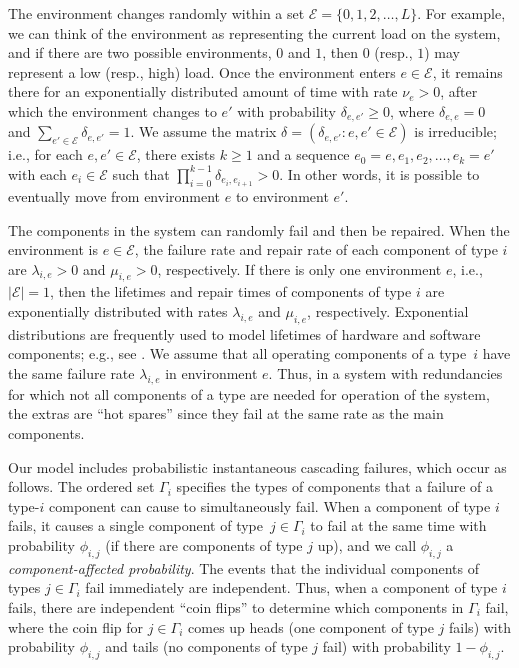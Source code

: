 \documentclass[12pt]{article}
\begin{document}
The environment changes randomly within a set $\mathcal{E} = \{ 0, 1, 2, \ldots,
L \}$. For example, we can think of the environment as representing the current
load on the system, and if there are two possible environments, $0$ and $1$,
then $0$ (resp., $1$) may represent a low (resp., high) load. Once the
environment enters $e \in \mathcal{E}$, it remains there for an exponentially
distributed amount of time with rate $\nu_e > 0$, after which the environment
changes to $e'$ with probability $\delta_{e, e'} \geq 0$, where $\delta_{e, e} =
0$ and $\sum_{e' \in \mathcal{E}} \delta_{e, e'} = 1$. We assume the matrix
$\delta = (\delta_{e, e'} : e, e' \in \mathcal{E})$ is irreducible; i.e., for
each $e, e' \in \mathcal{E}$, there exists $k \geq 1$ and a sequence $e_0 = e,
e_1, e_2, \ldots, e_k = e'$ with each $e_i \in \mathcal{E}$ such that $\prod_{i
= 0}^{k-1} \delta_{e_i, e_{i + 1}} > 0$. In other words, it is possible to
eventually move from environment $e$ to environment $e'$.

The components in the system can randomly fail and then be repaired. When the
environment is $e \in \mathcal{E}$, the failure rate and repair rate of each
component of type $i$ are $\lambda_{i, e} > 0$ and $\mu_{i, e} > 0$,
respectively.  If there is only one environment $e$, i.e., $| \mathcal{E} | =
1$, then the lifetimes and repair times of components of type $i$ are
exponentially distributed with rates $\lambda_{i, e}$ and $\mu_{i, e}$,
respectively. Exponential distributions are frequently used to model lifetimes
of hardware and software components; e.g., see \cite{XDP:2004}. We assume that
all operating components of a type~$i$ have the same failure rate $\lambda_{i,
e}$ in environment $e$. Thus, in a system with  redundancies for which not all
components of a type are needed for operation of the system, the extras are
``hot spares'' since they fail at the same rate as the main components.

Our model includes probabilistic instantaneous cascading failures, which occur
as follows. The ordered set $\Gamma_i$ specifies the types of components that a
failure of a type-$i$ component can cause to simultaneously fail. When a
component of type $i$ fails, it causes a single  component of type~$j \in
\Gamma_i$ to fail at the same time with probability $\phi_{i, j}$ (if there are
components of type $j$ up), and we call
$\phi_{i, j}$  a \textit{component-affected probability}. The events that the
individual components of types $j \in
\Gamma_i$ fail immediately are independent. Thus, when a component of type $i$
fails, there are independent ``coin flips'' to determine which components in
$\Gamma_i$ fail, where the coin flip for $j \in \Gamma_i$ comes up heads (one
component of type $j$ fails) with probability $\phi_{i, j}$ and tails (no
components of type $j$ fail) with probability $1 - \phi_{i, j}$.
\end{document}
